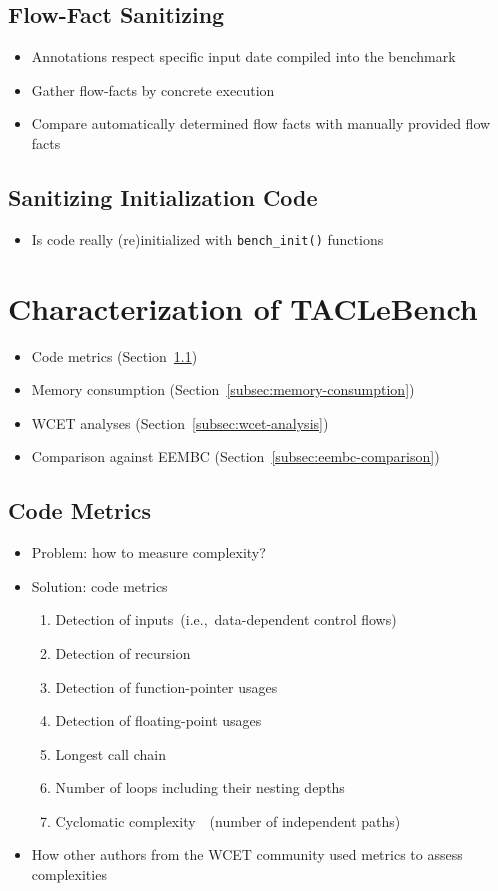 \documentclass[a4paper,USenglish]{lites}
\newcommand*{\ie}{i.e.,~}
\begin{document}
\subsection{Flow-Fact Sanitizing}
\begin{itemize}
  \item Annotations respect specific input date compiled into the benchmark
  \item Gather flow-facts by concrete execution
  \item Compare automatically determined flow facts with manually provided flow facts
\end{itemize}

\subsection{Sanitizing Initialization Code}
\label{subsec:sanity-init-code}
\begin{itemize}
  \item Is code really (re)initialized with \lstinline|bench_init()| functions
\end{itemize}

\section{Characterization of TACLeBench}
\begin{itemize}
  \item Code metrics (Section~\ref{subsec:code-metrics})
  \item Memory consumption (Section~\ref{subsec:memory-consumption})
  \item WCET analyses (Section~\ref{subsec:wcet-analysis})
  \item Comparison against EEMBC (Section~\ref{subsec:eembc-comparison})
\end{itemize}

\subsection{Code Metrics}
\label{subsec:code-metrics}
\begin{itemize}
  \item Problem: how to measure complexity?
  \item Solution: code metrics
  \begin{enumerate}
    \item Detection of inputs~(\ie data-dependent control flows)
    \item Detection of recursion
    \item Detection of function-pointer usages
    \item Detection of floating-point usages
    \item Longest call chain
    \item Number of loops including their nesting depths
    \item Cyclomatic complexity~\cite{mccabe:1976:complexity}~(number of independent paths)
  \end{enumerate}
  \item How other authors from the WCET community used metrics to assess complexities~\cite{audsley:2004:assessment}
\end{itemize}
\end{document}
